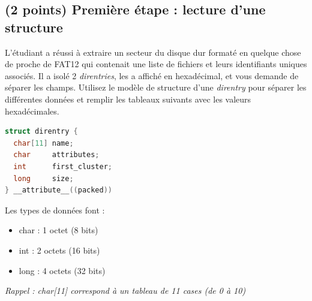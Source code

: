 \documentclass[11pt,a4paper]{article}
\begin{document}
\bigskip

\subsection{(2 points) Première étape : lecture d'une structure }

L'étudiant a réussi à extraire un secteur du disque dur formaté en quelque chose de proche de FAT12 qui contenait une liste de fichiers et leurs identifiants uniques associés.
Il a isolé 2 \textit{direntries}, les a affiché en hexadécimal, et vous demande de séparer les champs.
Utilisez le modèle de structure d'une \textit{direntry} pour séparer les différentes données et remplir les tableaux suivants avec les valeurs hexadécimales.

\clearpage

\begin{table}[ht!]
  \centering
  \begin{minipage}{0.45\textwidth}
    \centering
\begin{lstlisting}[language=C]
struct direntry {
  char[11] name;
  char     attributes;
  int      first_cluster;
  long     size;
} __attribute__((packed)) \end{lstlisting}
  \end{minipage}
  \hfillx
  \begin{minipage}{0.45\textwidth}
Les types de données font :

\begin{itemize}
\item char : 1 octet (8 bits)
\item int : 2 octets (16 bits)
\item long : 4 octets (32 bits)
\end{itemize}

\textit{Rappel : char[11] correspond à un tableau de 11 cases (de 0 à 10)}
  \end{minipage}
\end{table}


\vspace*{-0.5cm}
\end{document}
